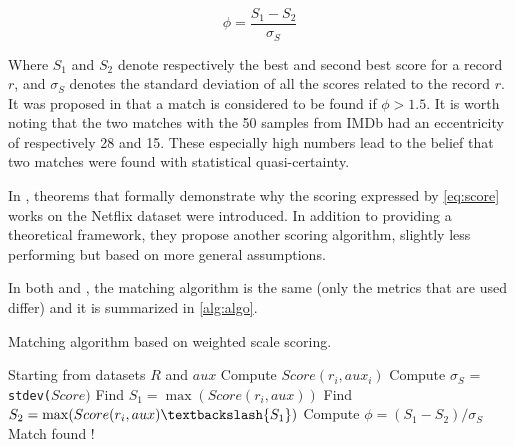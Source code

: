 \begin{equation}
	\phi = \frac{S_1-S_2}{\sigma_S}
\end{equation}

Where $S_1$ and $S_2$ denote respectively the best and second best score for a record $r$, and $\sigma_S$ denotes the standard deviation of all the scores related to the record $r$. It was proposed in \cite{netflix} that a match is considered to be found if $\phi > 1.5$. It is worth noting that the two matches with the 50 samples from IMDb had an eccentricity of respectively 28 and 15. These especially high numbers lead to the belief that two matches were found with statistical quasi-certainty.

In \cite{netflix-analytic}, theorems that formally demonstrate why the scoring expressed by \autoref{eq:score} works on the Netflix dataset were introduced. In addition to providing a theoretical framework, they propose another scoring algorithm, slightly less performing but based on more general assumptions.

In both \cite{netflix} and \cite{netflix-analytic}, the matching algorithm is the same (only the metrics that are used differ) and it is summarized in \autoref{alg:algo}.

\begin{algorithm}[h]
	\caption{Matching algorithm based on weighted scale scoring.}
	\label{alg:algo}
	\begin{algorithmic}[1]
		\State Starting from datasets $R$ and $aux$
		\newline
				\State Compute $Score(r_i,aux_i)$
			\EndFor
			\State Compute $\sigma_S$ = \texttt{stdev(}$Score\texttt{)}$
			\State Find $S_1 = \max(Score(r_i, aux))$
			\State Find $S_2 = \max(Score(r_i, aux) \textbackslash \{S_1\})$
			\State Compute $\phi = (S_1-S_2)/\sigma_S$
				\State Match found !
			\EndIf
		\EndFor
	\end{algorithmic}
\end{algorithm}


